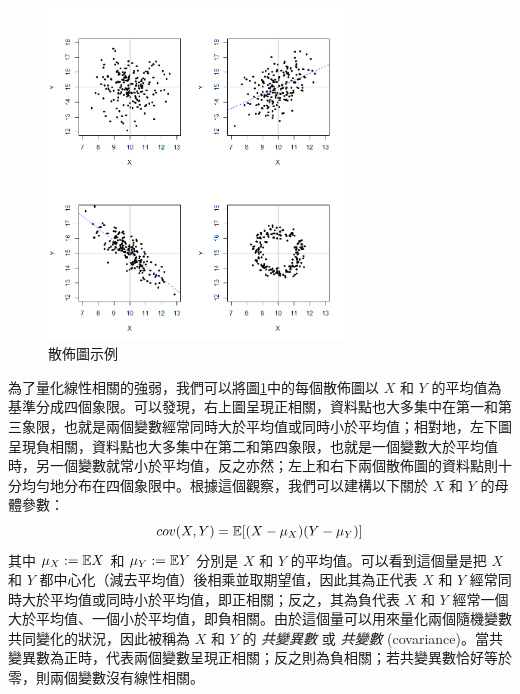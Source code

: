     \begin{figure}[htbp]
        \centering
        \includegraphics[width=0.7\textwidth]{figures/08-Correlation_linear_regression/scatterplot.png}
        \caption{散佈圖示例}
        \label{fig:scatterplot}
    \end{figure}

    為了量化線性相關的強弱，我們可以將圖\ref{fig:scatterplot}中的每個散佈圖以 $X$ 和 $Y$ 的平均值為基準分成四個象限。可以發現，右上圖呈現正相關，資料點也大多集中在第一和第三象限，也就是兩個變數經常同時大於平均值或同時小於平均值；相對地，左下圖呈現負相關，資料點也大多集中在第二和第四象限，也就是一個變數大於平均值時，另一個變數就常小於平均值，反之亦然；左上和右下兩個散佈圖的資料點則十分均勻地分布在四個象限中。根據這個觀察，我們可以建構以下關於 $X$ 和 $Y$ 的母體參數：
    \[cov(X,Y) = \mathbb{E}[(X-\mu_X)(Y-\mu_Y)]\]
    其中 $\mu_X := \mathbb{E} X$ 和 $\mu_Y := \mathbb{E} Y$ 分別是 $X$ 和 $Y$ 的平均值。可以看到這個量是把 $X$ 和 $Y$ 都中心化（減去平均值）後相乘並取期望值，因此其為正代表 $X$ 和 $Y$ 經常同時大於平均值或同時小於平均值，即正相關；反之，其為負代表 $X$ 和 $Y$ 經常一個大於平均值、一個小於平均值，即負相關。由於這個量可以用來量化兩個隨機變數共同變化的狀況，因此被稱為 $X$ 和 $Y$ 的 \textit{共變異數} 或 \textit{共變數} (covariance)。當共變異數為正時，代表兩個變數呈現正相關；反之則為負相關；若共變異數恰好等於零，則兩個變數沒有線性相關。
    
